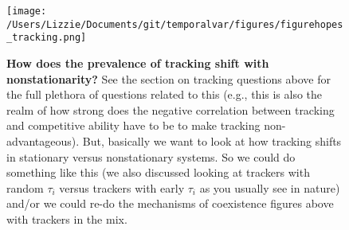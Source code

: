 \documentclass[11pt,a4paper,oneside]{article}
\begin{document}
\newpage
\begin{figure}[h!]
\centering
\noindent \texttt{[image: /Users/Lizzie/Documents/git/temporalvar/figures/figurehopes\_tracking.png]}
\caption{{\bf How does the prevalence of tracking shift with nonstationarity?} See the section on tracking questions above for the full plethora of questions related to this (e.g., this is also the realm of how strong does the negative correlation between tracking and competitive ability have to be to make tracking non-advantageous). But, basically we want to look at how tracking shifts in stationary versus nonstationary systems. So we could do something like this (we also discussed looking at trackers with random \(\tau_{i}\) versus trackers with early \(\tau_{i}\) as you usually see in nature) and/or we could re-do the mechanisms of coexistence figures above with trackers in the mix.}
\end{figure}
\end{document}
